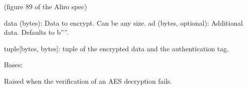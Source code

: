\documentclass[letterpaper,10pt,english]{sphinxmanual}
\begin{document}
\begin{fulllineitems}
\begin{fulllineitems}
\sphinxAtStartPar
(figure 8\sphinxhyphen{}9 of the Aliro spec)
\begin{description}
\sphinxAtStartPar
data (bytes): Data to encrypt. Can be any size.
ad (bytes, optional): Additional data. Defaults to b””.

\sphinxAtStartPar
tuple{[}bytes, bytes{]}: tuple of the encrypted data and the authentication tag.

\end{description}

\end{fulllineitems}


\end{fulllineitems}


\begin{fulllineitems}
\label{\detokenize{aliro_actuator.access_protocol.encryption:aliro_actuator.access_protocol.encryption.VerificationError}}
\pysigstartsignatures
{}
\pysigstopsignatures
\sphinxAtStartPar
Bases: {\hyperref[\detokenize{aliro_actuator.access_protocol.errors:aliro_actuator.access_protocol.errors.AccessProtocolError}]{}}

\sphinxAtStartPar
Raised when the verification of an AES decryption fails.

\end{fulllineitems}


\begin{fulllineitems}
\label{\detokenize{aliro_actuator.access_protocol.encryption:aliro_actuator.access_protocol.encryption.compute_cryptogram}}
\pysigstartsignatures
{}
\pysigstopsignatures
\end{fulllineitems}
\end{document}
